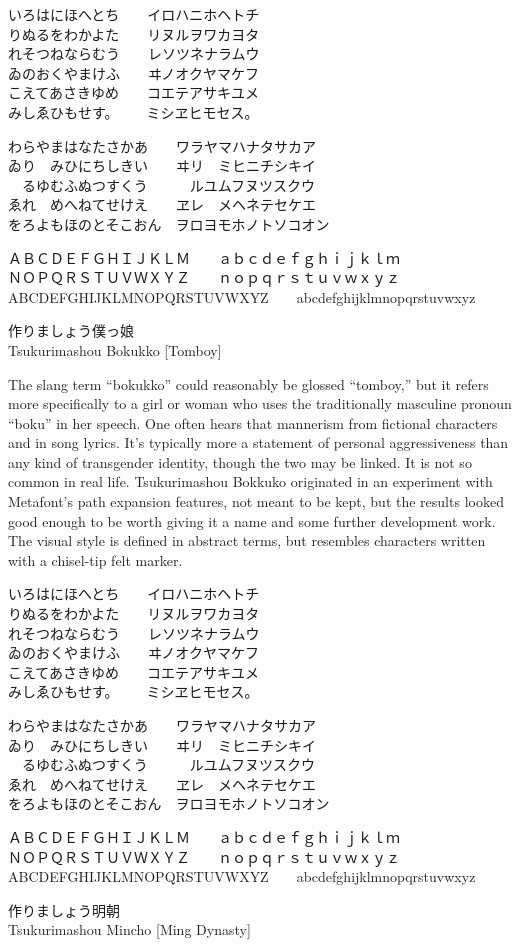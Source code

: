\documentclass[14pt]{extarticle}
\newcommand{\iroha}{%
いろはにほへとち~~~~イロハニホヘトチ\\
りぬるをわかよた~~~~リヌルヲワカヨタ\\
れそつねならむう~~~~レソツネナラムウ\\
ゐのおくやまけふ~~~~ヰノオクヤマケフ\\
こえてあさきゆめ~~~~コエテアサキユメ\\
みしゑひもせす。~~~~ミシヱヒモセス。\par
}
\newcommand{\gojuuonzu}{%
わらやまはなたさかあ~~~~ワラヤマハナタサカア\\
ゐり~~みひにちしきい~~~~ヰリ~~ミヒニチシキイ\\
~~るゆむふぬつすくう~~~~~~ルユムフヌツスクウ\\
ゑれ~~めへねてせけえ~~~~ヱレ~~メヘネテセケエ\\
をろよもほのとそこおん~~ヲロヨモホノトソコオン\par
}
\begin{document}
\tenshinokamimono
\iroha
\gojuuonzu

ＡＢＣＤＥＦＧＨＩＪＫＬＭ~~~~ａｂｃｄｅｆｇｈｉｊｋｌｍ\\
ＮＯＰＱＲＳＴＵＶＷＸＹＺ~~~~ｎｏｐｑｒｓｔｕｖｗｘｙｚ\\
ABCDEFGHIJKLMNOPQRSTUVWXYZ~~~~abcdefghijklmnopqrstuvwxyz

\clearpage

\fi


\bokukko

\Large
作りましょう僕っ娘\\
Tsukurimashou Bokukko [Tomboy]

\normalsize

The slang term ``bokukko'' could reasonably be glossed ``tomboy,'' but
it refers more specifically to a girl or woman who
uses the traditionally masculine pronoun ``boku'' in her speech.  One often
hears that mannerism from fictional characters and in song lyrics.  It's
typically more a statement of personal aggressiveness than any kind of
transgender identity, though the two may be linked. It is not so common in
real life.  Tsukurimashou Bokkuko originated in an experiment with
Metafont's path expansion features, not meant to be kept, but the results
looked good enough to be worth giving it a name and some further development
work.  The visual style is defined in abstract terms, but resembles
characters written with a chisel-tip felt marker.

\bokukkomono
\iroha
\gojuuonzu

ＡＢＣＤＥＦＧＨＩＪＫＬＭ~~~~ａｂｃｄｅｆｇｈｉｊｋｌｍ\\
ＮＯＰＱＲＳＴＵＶＷＸＹＺ~~~~ｎｏｐｑｒｓｔｕｖｗｘｙｚ\\
ABCDEFGHIJKLMNOPQRSTUVWXYZ~~~~abcdefghijklmnopqrstuvwxyz

\clearpage


\mincho

\Large
作りましょう明朝\\
Tsukurimashou Mincho [Ming Dynasty]

\normalsize
\end{document}

